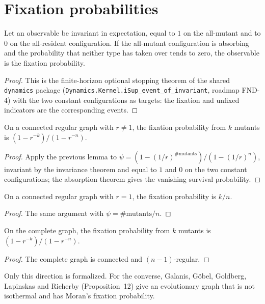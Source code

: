\section{Fixation probabilities}
\begin{lemma}\label{lem:fixation-limit}
\leanok
Let an observable be invariant in expectation, equal to $1$ on the all-mutant and to $0$ on the
all-resident configuration. If the all-mutant configuration is absorbing and the probability
that neither type has taken over tends to zero, the observable is the fixation probability.
\end{lemma}
\begin{proof}\leanok
This is the finite-horizon optional stopping theorem of the shared \texttt{dynamics} package
(\texttt{Dynamics.Kernel.iSup\_event\_of\_invariant}, roadmap FND-4) with the two constant
configurations as targets: the fixation and unfixed indicators are the corresponding events.
\end{proof}
\begin{theorem}\label{thm:isothermal}
\leanok{}
On a connected regular graph with $r\neq1$, the fixation probability from $k$ mutants is
$(1-r^{-k})/(1-r^{-n})$.
\end{theorem}
\begin{proof}\leanok
Apply the previous lemma to $\psi=(1-(1/r)^{\#\text{mutants}})/(1-(1/r)^n)$, invariant by the
invariance theorem and equal to $1$ and $0$ on the two constant configurations; the
absorption theorem gives the vanishing survival probability.
\end{proof}
\begin{theorem}\label{thm:neutral}
\leanok{}
On a connected regular graph with $r=1$, the fixation probability is $k/n$.
\end{theorem}
\begin{proof}\leanok
The same argument with $\psi=\#\text{mutants}/n$.
\end{proof}
\begin{theorem}\label{thm:moran}
\leanok{}
On the complete graph, the fixation probability from $k$ mutants is $(1-r^{-k})/(1-r^{-n})$.
\end{theorem}
\begin{proof}\leanok
The complete graph is connected and $(n-1)$-regular.
\end{proof}
Only this direction is formalized. For the converse, Galanis, Göbel, Goldberg, Lapinskas and
Richerby (Proposition~12) give an evolutionary graph that is not isothermal and has Moran's
fixation probability.

